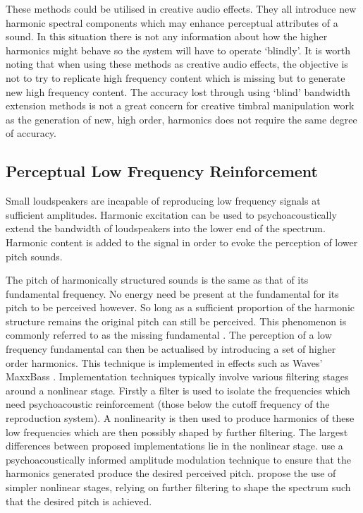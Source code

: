 		These methods could be utilised in creative audio effects. They all introduce new harmonic spectral
		components which may enhance perceptual attributes of a sound. In this situation there is not any
		information about how the higher harmonics might behave so the system will have to operate `blindly'. It is
		worth noting that when using these methods as creative audio effects, the objective is not to try to
		replicate high frequency content which is missing but to generate new high frequency content. The accuracy
		lost through using `blind' bandwidth extension methods is not a great concern for creative timbral
		manipulation work as the generation of new, high order, harmonics does not require the same degree of
		accuracy.

	\subsection{Perceptual Low Frequency Reinforcement}
	\label{sec:Excitation-Uses-Reinforcement}
		Small loudspeakers are incapable of reproducing low frequency signals at sufficient amplitudes. Harmonic
		excitation can be used to psychoacoustically extend the bandwidth of loudspeakers into the lower end of the
		spectrum. Harmonic content is added to the signal in order to evoke the perception of lower pitch sounds.
		
		The pitch of harmonically structured sounds is the same as that of its fundamental frequency. No energy need
		be present at the fundamental for its pitch to be perceived however. So long as a sufficient proportion of
		the harmonic structure remains the original pitch can still be perceived. This phenomenon is commonly
		referred to as the missing fundamental \citep{plack2005the}. The perception of a low frequency fundamental
		can then be actualised by introducing a set of higher order harmonics. This technique is implemented in
		effects such as Waves' MaxxBass \citep{ben-tzur1999the}. Implementation techniques typically involve various
		filtering stages around a nonlinear stage. Firstly a filter is used to isolate the frequencies which need
		psychoacoustic reinforcement (those below the cutoff frequency of the reproduction system). A nonlinearity
		is then used to produce harmonics of these low frequencies which are then possibly shaped by further
		filtering. The largest differences between proposed implementations lie in the nonlinear stage.
		\citet{gan2001virtual} use a psychoacoustically informed amplitude modulation technique to ensure that the
		harmonics generated produce the desired perceived pitch. \citet{larsen2002reproducing} propose the use of
		simpler nonlinear stages, relying on further filtering to shape the spectrum such that the desired pitch is
		achieved.

